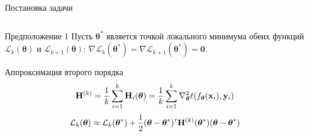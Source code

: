 \documentclass[aspectratio=169]{beamer}
\begin{document}
\begin{frame}{Постановка задачи}
\begin{columns}
        \begin{column}{0.6\textwidth}
        \begin{center}
        \vspace{-2em}
         \begin{block}{Предположение 1}
            \vspace{-0.5em}
            Пусть $\boldsymbol{\theta}^*$ является точкой локального минимума обеих функций $\mathcal{L}_{k}(\boldsymbol{\theta})$ и $\mathcal{L}_{k+1}(\boldsymbol{\theta})$: $\nabla \mathcal{L}_{k}(\boldsymbol{\theta}^*) = \nabla \mathcal{L}_{k+1}(\boldsymbol{\theta}^*) = \mathbf{0}$.
        \end{block}
        \vspace{-0.5em}
        \begin{block}{Аппроксимация второго порядка}
        \vspace{-1.7em}
        \[\mathbf{H}^{(k)} = \dfrac{1}{k} \sum\limits_{i=1}^{k} \mathbf{H}_{i}(\boldsymbol{\theta}) = \dfrac1k \sum\limits_{i=1}^k\nabla_{\boldsymbol{\theta}}^2\ell(f_{\boldsymbol{\theta}}(\mathbf{x}_i), \mathbf{y}_i)\]
        \vspace{-1.0em}
        \begin{equation*}
            \mathcal{L}_{k}(\boldsymbol{\theta}) \approx \mathcal{L}_{k}(\boldsymbol{\theta}^*) + \dfrac{1}{2} (\boldsymbol{\theta} - \boldsymbol{\theta}^*)^{\text{\tiny\sffamily\upshape\mdseries T}} \mathbf{H}^{(k)}(\boldsymbol{\theta}^*) (\boldsymbol{\theta} - \boldsymbol{\theta}^*)
        \end{equation*}
        \vspace{-1.5em}
        \end{block}
        
        \end{center}
        \end{column}
        
    \end{columns}

\end{frame}
\end{document}
